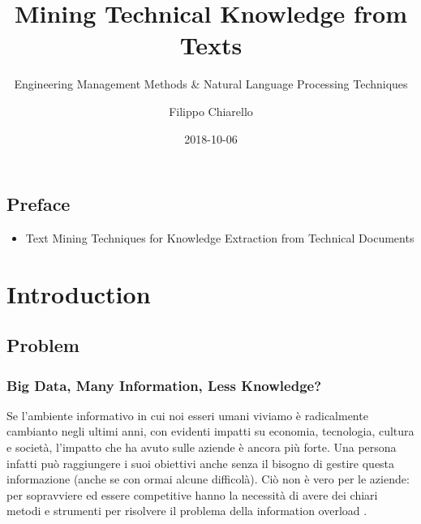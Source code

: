 \documentclass[]{book}
\title{Mining Technical Knowledge from Texts}
\subtitle{Engineering Management Methods \& Natural Language Processing Techniques}
\author{Filippo Chiarello}
\date{2018-10-06}
\providecommand{\tightlist}{%
  \setlength{\itemsep}{0pt}\setlength{\parskip}{0pt}}
\begin{document}
\maketitle

{
\setcounter{tocdepth}{1}
\tableofcontents
}
\chapter*{Preface}\label{preface}

\begin{itemize}
\tightlist
\item
  Text Mining Techniques for Knowledge Extraction from Technical
  Documents
\end{itemize}

\part{Introduction}\label{part-introduction}

\chapter{Problem}\label{problem}

\section{Big Data, Many Information, Less
Knowledge?}\label{big-data-many-information-less-knowledge}

Se l'ambiente informativo in cui noi esseri umani viviamo è radicalmente
cambianto negli ultimi anni, con evidenti impatti su economia,
tecnologia, cultura e società, l'impatto che ha avuto sulle aziende è
ancora più
forte\citep{Arun2006Firm, jin2015significance, degryse2016digitalisation, john2014big, o2016weapons}.
Una persona infatti può raggiungere i suoi obiettivi anche senza il
bisogno di gestire questa informazione (anche se con ormai alcune
difficolà). Ciò non è vero per le aziende: per sopravviere ed essere
competitive hanno la necessità di avere dei chiari metodi e strumenti
per risolvere il problema della information overload
\citep{levitin2014organized, feng2015competing}.
\end{document}
